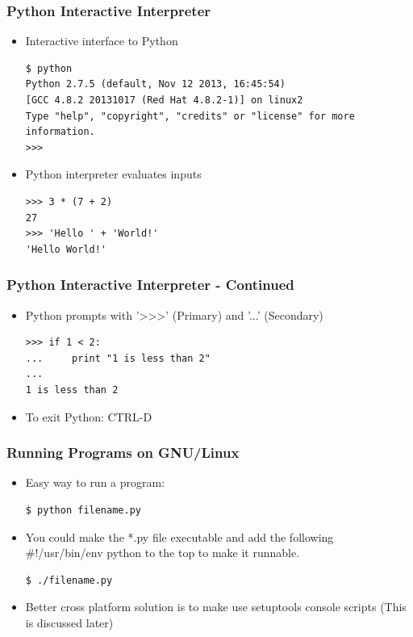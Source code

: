 \documentclass[12pt,handout]{beamer}
\begin{document}
\begin{frame}[fragile]
\frametitle{Python Interactive Interpreter}

\begin{itemize}

\item{Interactive interface to Python

\small{
\begin{verbatim}
$ python
Python 2.7.5 (default, Nov 12 2013, 16:45:54)
[GCC 4.8.2 20131017 (Red Hat 4.8.2-1)] on linux2
Type "help", "copyright", "credits" or "license" for more information.
>>>
\end{verbatim}
}
}

\item{Python interpreter evaluates inputs

\small{
\begin{verbatim}
>>> 3 * (7 + 2)
27
>>> 'Hello ' + 'World!'
'Hello World!'
\end{verbatim}
}
}
\end{itemize}
\end{frame}

\begin{frame}[fragile]
\frametitle{Python Interactive Interpreter - Continued}

\begin{itemize}

\item{Python prompts with '>>>' (Primary) and '...' (Secondary)

\small{
\begin{verbatim}
>>> if 1 < 2:
...     print "1 is less than 2"
...
1 is less than 2
\end{verbatim}
}
}

\item To exit Python:  CTRL-D

\end{itemize}
\end{frame}

\begin{frame}[fragile]
\frametitle{Running Programs on GNU/Linux}

\begin{itemize}
\item Easy way to run a program:

\small{
\begin{verbatim}
$ python filename.py
\end{verbatim}
}

\item You could make the *.py file executable and add the
following \#!/usr/bin/env python to the top to make it
runnable.

\small{
\begin{verbatim}
$ ./filename.py
\end{verbatim}
}

\item Better cross platform solution is to make use setuptools console scripts
  (This is discussed later)
\end{itemize}

\end{frame}
\end{document}
